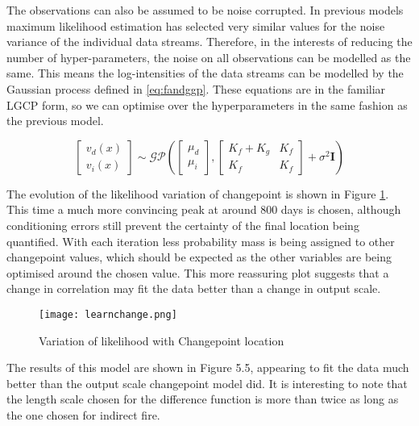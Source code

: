 \documentclass[a4paper,11pt]{report}
\begin{document}
The observations can also be assumed to be noise corrupted. In previous models maximum likelihood estimation has selected very similar values for the noise variance of the individual data streams. Therefore, in the interests of reducing the number of hyper-parameters, the noise on all observations can be modelled as the same. This means the log-intensities of the data streams can be modelled by the Gaussian process defined in \ref{eq:fandggp}. These equations are in the familiar LGCP form, so we can optimise over the hyperparameters in the same fashion as the previous model. 

\begin{equation} \label{eq:fandggp}
\left[ \begin{array}{cc}
v_d(x)  \\
v_i(x) \end{array} \right] \sim \mathcal{G}\mathcal{P} \left( \left[ \begin{array}{cc}
\mu_d  \\
\mu_i \end{array} \right], \left[ \begin{array}{cc}
K_f + K_g & K_f  \\
K_f  & K_f  \end{array} \right] + \sigma^2 \mathbf{I} \right)
\end{equation}

The evolution of the likelihood variation of changepoint is shown in Figure \ref{fig:cccpvariation}. This time a much more convincing peak at around 800 days is chosen, although conditioning errors still prevent the certainty of the final location being quantified. With each iteration less probability mass is being assigned to other changepoint values, which should be expected as the other variables are being optimised around the chosen value. This more reassuring plot suggests that a change in correlation may fit the data better than a change in output scale. \par


\begin{figure}
\centering
\texttt{[image: learnchange.png]}
\caption{Variation of likelihood with Changepoint location}
\label{fig:cccpvariation}
\end{figure}

The results of this model are shown in Figure 5.5, appearing to fit the data much better than the output scale changepoint model did. It is interesting to note that the length scale chosen for the difference function is more than twice as long as the one chosen for indirect fire.
\end{document}
